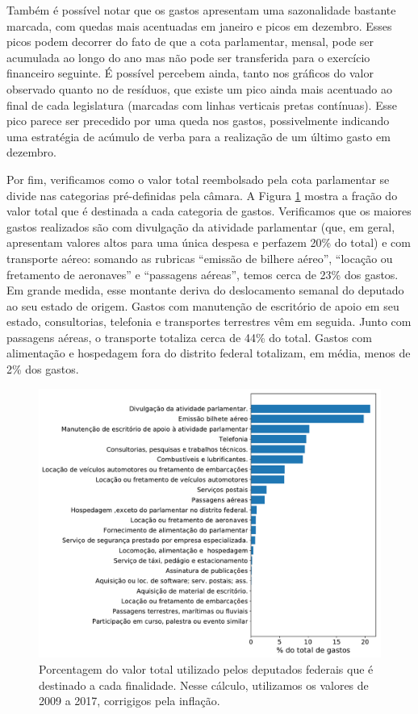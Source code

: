 \documentclass[12pt,a4paper]{article}
\begin{document}
Também é possível notar que os gastos apresentam uma sazonalidade bastante marcada, com quedas mais
acentuadas em janeiro e picos em dezembro. Esses picos podem decorrer do fato de que a cota parlamentar, mensal,
pode ser acumulada ao longo do ano mas não pode ser transferida para o exercício financeiro seguinte.
É possível percebem ainda, tanto nos gráficos do valor observado quanto no de resíduos, que existe
um pico ainda mais acentuado ao final de cada legislatura (marcadas com linhas verticais pretas contínuas).
Esse pico parece ser precedido por uma queda nos gastos, possivelmente indicando uma estratégia de acúmulo de verba
para a realização de um último gasto em dezembro.

Por fim, verificamos como o valor total reembolsado pela cota parlamentar se divide nas categorias pré-definidas
pela câmara. A Figura \ref{fig:despesas-por-tipo} mostra a fração do valor total que é destinada a cada categoria
de gastos. Verificamos que os maiores gastos realizados são com divulgação da atividade parlamentar (que, em geral,
apresentam valores altos para uma única despesa e perfazem 20\% do total) e com transporte aéreo: somando as rubricas
``emissão de bilhere aéreo'', ``locação ou fretamento de aeronaves'' e ``passagens aéreas'', temos cerca de
23\% dos gastos. Em grande medida, esse montante deriva do deslocamento semanal do deputado ao seu estado de origem.
Gastos com manutenção de escritório de apoio em seu estado, consultorias, telefonia e transportes terrestres vêm
em seguida. Junto com passagens aéreas, o transporte totaliza cerca de 44\% do total. Gastos com alimentação e
hospedagem fora do distrito federal totalizam, em média, menos de 2\% dos gastos.

\begin{figure}[H]
\centering
\includegraphics[width=1.0\textwidth]{graficos/total-despesas-por-tipo_2019-04-29.pdf}
\caption{Porcentagem do valor total utilizado pelos deputados federais que é destinado a cada finalidade. Nesse
cálculo, utilizamos os valores de 2009 a 2017, corrigigos pela inflação.}
\label{fig:despesas-por-tipo}
\end{figure} 
\end{document}

